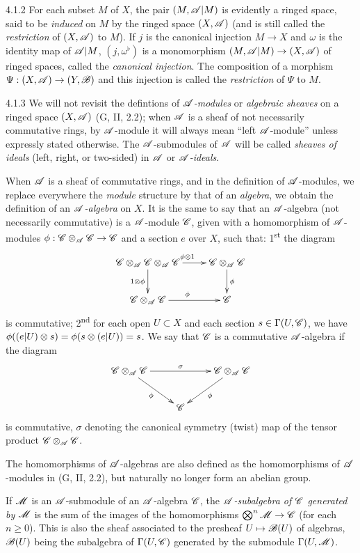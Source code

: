 \documentclass[10pt,oneside]{book}
\begin{document}
\begin{env}{4.1.2}
\label{env-0.4.1.2}
For each subset $M$ of $X$, the pair $(M,\mathscr{A}|M)$ is evidently a ringed space, said
to be \emph{induced} on $M$ by the ringed space $(X,\mathscr{A})$ (and is still called
the \emph{restriction} of $(X,\mathscr{A})$ to $M$). If $j$ is the canonical injection
$M\to X$ and $\omega$ is the identity map of $\mathscr{A}|M$, $(j,\omega^\flat)$ is a
monomorphism $(M,\mathscr{A}|M)\to(X,\mathscr{A})$ of ringed spaces, called the
\emph{canonical injection}. The composition of a morphism
$\Psi:(X,\mathscr{A})\to(Y,\mathscr{B})$ and this injection is called the \emph{restriction}
of $\Psi$ to $M$.
\end{env}

\begin{env}{4.1.3}
\label{env-0.4.1.3}
We will not revisit the defintions of \emph{$\mathscr{A}$-modules} or
\emph{algebraic sheaves} on a ringed space $(X,\mathscr{A})$ (G, II, 2.2);
when $\mathscr{A}$ is a sheaf of not necessarily commutative rings, by $\mathscr{A}$-module
it will always mean ``left $\mathscr{A}$-module'' unless expressly stated otherwise. The
$\mathscr{A}$-submodules of $\mathscr{A}$ will be called \emph{sheaves of ideals} (left,
right, or two-sided) in $\mathscr{A}$ or \emph{$\mathscr{A}$-ideals}.

When $\mathscr{A}$ is a sheaf of commutative rings, and in the definition of
$\mathscr{A}$-modules, we replace everywhere the \emph{module} structure by that of
an \emph{algebra}, we obtain the definition of an \emph{$\mathscr{A}$-algebra} on $X$.
It is the same to say that an $\mathscr{A}$-algebra (not necessarily commutative) is
a $\mathscr{A}$-module $\mathscr{C}$, given with a homomorphism of $\mathscr{A}$-modules
$\phi:\mathscr{C}\otimes_\mathscr{A}\mathscr{C}\to\mathscr{C}$ and a section $e$ over $X$,
such that: 1\textsuperscript{st} the diagram
\[
  \xymatrix{
    \sh{C}\otimes_\sh{A}\sh{C}\otimes_\sh{A}\sh{C}
    \ar[r]^{\vphi\otimes 1}\ar[d]_{1\otimes\vphi} &
    \sh{C}\otimes_\sh{A}\sh{C}\ar[d]^\vphi\\
    \sh{C}\otimes_\sh{A}\sh{C}\ar[r]^\vphi & \sh{C}
  }
\]
is commutative; 2\textsuperscript{nd} for each open $U\subset X$ and each section
$s\in\Gamma(U,\mathscr{C})$, we have $\phi((e|U)\otimes s)=\phi(s\otimes(e|U))=s$.
We say that $\mathscr{C}$ is a commutative $\mathscr{A}$-algebra if the diagram
\[
  \xymatrix{
    \sh{C}\otimes_\sh{A}\sh{C}\ar[rr]^\sigma\ar[rd]_\vphi
    & & \sh{C}\otimes_\sh{A}\sh{C}\ar[ld]^\vphi\\
    & \sh{C}
  }
\]
is commutative, $\sigma$ denoting the canonical symmetry (twist) map of the tensor product
$\mathscr{C}\otimes_\mathscr{A}\mathscr{C}$.

The homomorphisms of $\mathscr{A}$-algebras are also defined as the homomorphisms of
$\mathscr{A}$-modules in (G, II, 2.2), but naturally no longer form an abelian group.

If $\mathscr{M}$ is an $\mathscr{A}$-submodule of an $\mathscr{A}$-algebra $\mathscr{C}$, the
\emph{$\mathscr{A}$-subalgebra of $\mathscr{C}$ generated by $\mathscr{M}$} is the sum of the images of the
homomorphisms $\bigotimes^n\mathscr{M}\to\mathscr{C}$ (for each $n\geqslant 0$). This is also the sheaf
associated to the presheaf $U\mapsto\mathscr{B}(U)$ of algebras, $\mathscr{B}(U)$ being the subalgebra
of $\Gamma(U,\mathscr{C})$ generated by the submodule $\Gamma(U,\mathscr{M})$.
\end{env}
\end{document}
